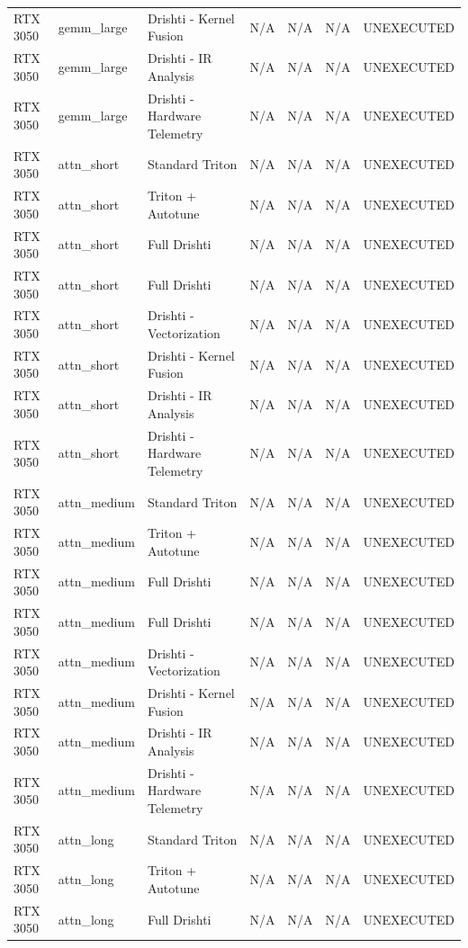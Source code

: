 \begin{table}[htbp]
\begin{tabular}{lllrrrc}
RTX 3050 & gemm_large & Drishti - Kernel Fusion & N/A & N/A & N/A & UNEXECUTED \\
RTX 3050 & gemm_large & Drishti - IR Analysis & N/A & N/A & N/A & UNEXECUTED \\
RTX 3050 & gemm_large & Drishti - Hardware Telemetry & N/A & N/A & N/A & UNEXECUTED \\
RTX 3050 & attn_short & Standard Triton & N/A & N/A & N/A & UNEXECUTED \\
RTX 3050 & attn_short & Triton + Autotune & N/A & N/A & N/A & UNEXECUTED \\
RTX 3050 & attn_short & Full Drishti & N/A & N/A & N/A & UNEXECUTED \\
RTX 3050 & attn_short & Full Drishti & N/A & N/A & N/A & UNEXECUTED \\
RTX 3050 & attn_short & Drishti - Vectorization & N/A & N/A & N/A & UNEXECUTED \\
RTX 3050 & attn_short & Drishti - Kernel Fusion & N/A & N/A & N/A & UNEXECUTED \\
RTX 3050 & attn_short & Drishti - IR Analysis & N/A & N/A & N/A & UNEXECUTED \\
RTX 3050 & attn_short & Drishti - Hardware Telemetry & N/A & N/A & N/A & UNEXECUTED \\
RTX 3050 & attn_medium & Standard Triton & N/A & N/A & N/A & UNEXECUTED \\
RTX 3050 & attn_medium & Triton + Autotune & N/A & N/A & N/A & UNEXECUTED \\
RTX 3050 & attn_medium & Full Drishti & N/A & N/A & N/A & UNEXECUTED \\
RTX 3050 & attn_medium & Full Drishti & N/A & N/A & N/A & UNEXECUTED \\
RTX 3050 & attn_medium & Drishti - Vectorization & N/A & N/A & N/A & UNEXECUTED \\
RTX 3050 & attn_medium & Drishti - Kernel Fusion & N/A & N/A & N/A & UNEXECUTED \\
RTX 3050 & attn_medium & Drishti - IR Analysis & N/A & N/A & N/A & UNEXECUTED \\
RTX 3050 & attn_medium & Drishti - Hardware Telemetry & N/A & N/A & N/A & UNEXECUTED \\
RTX 3050 & attn_long & Standard Triton & N/A & N/A & N/A & UNEXECUTED \\
RTX 3050 & attn_long & Triton + Autotune & N/A & N/A & N/A & UNEXECUTED \\
RTX 3050 & attn_long & Full Drishti & N/A & N/A & N/A & UNEXECUTED \\

\end{tabular}
\end{table}
